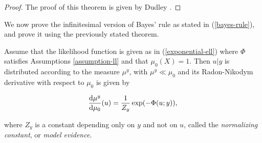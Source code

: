 \begin{proof}
  The proof of this theorem is given by Dudley \cite{dudley_2002}.
\end{proof}

We now prove the infinitesimal version of Bayes' rule as stated in (\ref{bayes-rule}), and prove it using the previously stated theorem.

\begin{theorem}
  Assume that the likelihood function is given as in (\ref{exponential-ell}) where $\Phi$ satisfies Assumptions \ref{assumption-ll} and that $\mu_0(X) = 1$. Then $u | y$ is distributed according to the measure $\mu^y$, with $\mu^y \ll \mu_0$ and its Radon-Nikodym derivative with respect to $\mu_0$ is given by

  \begin{equation}
    \frac{\text{d} \mu^y}{\text{d} \mu_0}(u) = \frac1{Z_y}\exp(-\Phi(u;y)),
  \end{equation}

  where $Z_y$ is a constant depending only on $y$ and not on $u$, called the \textit{normalizing constant}, or \textit{model evidence}.
\end{theorem}

